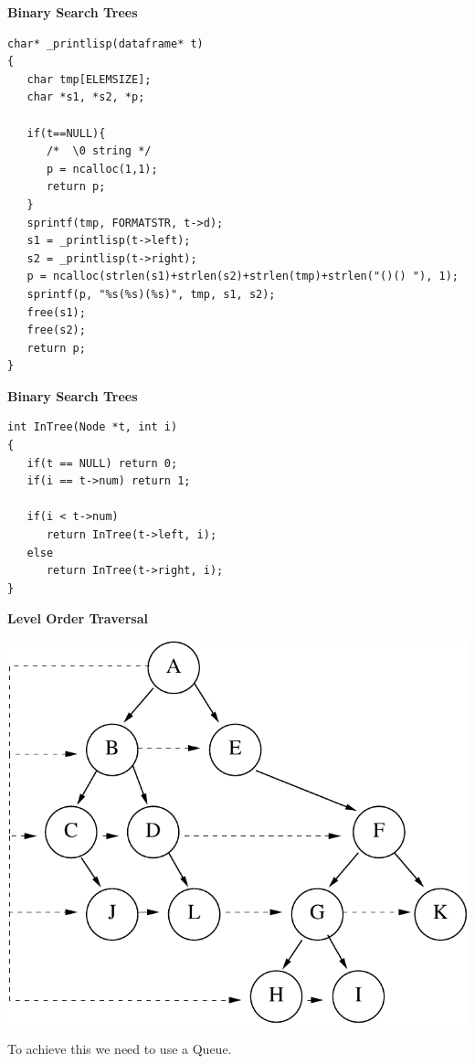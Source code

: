 \documentclass[a4,portraitt]{slides}
\begin{document}
\newpage
{\samepage
\begin{center}
{\Large{\bf Binary Search Trees}}
\end{center}
{\small
\begin{verbatim}
char* _printlisp(dataframe* t)
{
   char tmp[ELEMSIZE];
   char *s1, *s2, *p;

   if(t==NULL){
      /*  \0 string */
      p = ncalloc(1,1);
      return p;
   }
   sprintf(tmp, FORMATSTR, t->d);
   s1 = _printlisp(t->left);
   s2 = _printlisp(t->right);
   p = ncalloc(strlen(s1)+strlen(s2)+strlen(tmp)+strlen("()() "), 1);
   sprintf(p, "%s(%s)(%s)", tmp, s1, s2);
   free(s1);
   free(s2);
   return p;
}
\end{verbatim}
}

\newpage
{\samepage
\begin{center}
{\Large{\bf Binary Search Trees}}
\end{center}
\begin{verbatim}
int InTree(Node *t, int i)
{
   if(t == NULL) return 0;
   if(i == t->num) return 1;

   if(i < t->num)
      return InTree(t->left, i);
   else
      return InTree(t->right, i);
}
\end{verbatim}
}

\newpage
{\samepage
\begin{center}
{\Large{\bf Level Order Traversal}}
\end{center}
\begin{center}
\includegraphics{../Images/treelvl.pdf}
\end{center}
To achieve this we need to use a Queue.
}

}
\end{document}
